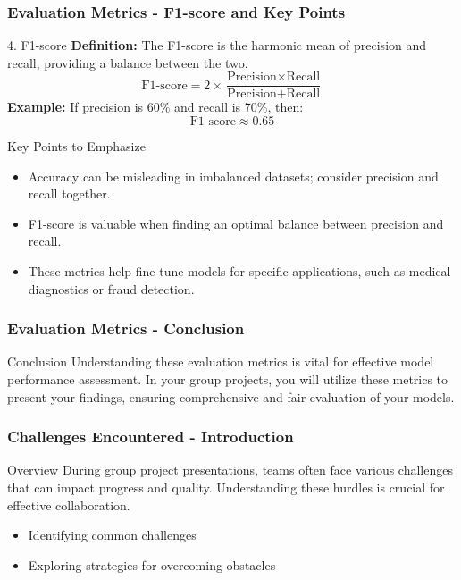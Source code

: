 \documentclass[aspectratio=169]{beamer}
\begin{document}
\begin{frame}[fragile]
    \frametitle{Evaluation Metrics - F1-score and Key Points}
    \begin{block}{4. F1-score}
        \textbf{Definition:} The F1-score is the harmonic mean of precision and recall, providing a balance between the two.
        \begin{equation}
            \text{F1-score} = 2 \times \frac{\text{Precision} \times \text{Recall}}{\text{Precision} + \text{Recall}}
        \end{equation}
        \textbf{Example:} If precision is 60\% and recall is 70\%, then:
        \begin{equation}
            \text{F1-score} \approx 0.65
        \end{equation}
    \end{block}

    \begin{block}{Key Points to Emphasize}
        \begin{itemize}
            \item Accuracy can be misleading in imbalanced datasets; consider precision and recall together.
            \item F1-score is valuable when finding an optimal balance between precision and recall.
            \item These metrics help fine-tune models for specific applications, such as medical diagnostics or fraud detection.
        \end{itemize}
    \end{block}
\end{frame}

\begin{frame}[fragile]
    \frametitle{Evaluation Metrics - Conclusion}
    \begin{block}{Conclusion}
        Understanding these evaluation metrics is vital for effective model performance assessment. In your group projects, you will utilize these metrics to present your findings, ensuring comprehensive and fair evaluation of your models.
    \end{block}
\end{frame}

\begin{frame}[fragile]
  \frametitle{Challenges Encountered - Introduction}
  \begin{block}{Overview}
    During group project presentations, teams often face various challenges that can impact progress and quality. Understanding these hurdles is crucial for effective collaboration.
  \end{block}

  \begin{itemize}
    \item Identifying common challenges
    \item Exploring strategies for overcoming obstacles
  \end{itemize}
\end{frame}
\end{document}
